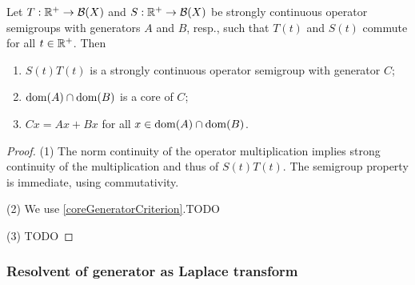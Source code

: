 \begin{proposition} \label{productSemigroup}
Let $T: \mathbb{R}^+\to \operatorname{\mathcal{B}}(X)$ and $S: \mathbb{R}^+\to \operatorname{\mathcal{B}}(X)$ be strongly continuous operator semigroups with generators $A$ and $B$, resp., such that $T(t)$ and $S(t)$ commute for all $t\in \mathbb{R}^+$. Then
\begin{enumerate}
\item $S(t)T(t)$ is a strongly continuous operator semigroup with generator $C$;
\item $\operatorname{dom}(A)\cap \operatorname{dom}(B)$ is a core of $C$;
\item $Cx = Ax + Bx$ for all $x\in \operatorname{dom}(A)\cap \operatorname{dom}(B)$.
\end{enumerate}
\end{proposition}
\begin{proof}
(1) The norm continuity of the operator multiplication implies strong continuity of the multiplication and thus of $S(t)T(t)$. The semigroup property is immediate, using commutativity.

(2) We use \ref{coreGeneratorCriterion}.TODO

(3) TODO
\end{proof}

\subsubsection{Resolvent of generator as Laplace transform}

